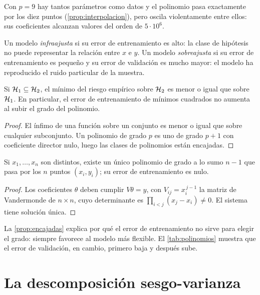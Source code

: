 Con $p=9$ hay tantos parámetros como datos y el polinomio pasa exactamente por los diez puntos (\cref{prop:interpolacion}), pero oscila violentamente entre ellos: sus coeficientes alcanzan valores del orden de $5\cdot 10^{6}$.

\begin{definicion}
Un modelo \emph{infraajusta} si su error de entrenamiento es alto: la clase de hipótesis no puede representar la relación entre $x$ e $y$. Un modelo \emph{sobreajusta} si su error de entrenamiento es pequeño y su error de validación es mucho mayor: el modelo ha reproducido el ruido particular de la muestra.
\end{definicion}

\begin{proposicion}\label{prop:encajadas}
Si $\mathcal{H}_1\subseteq\mathcal{H}_2$, el mínimo del riesgo empírico sobre $\mathcal{H}_2$ es menor o igual que sobre $\mathcal{H}_1$. En particular, el error de entrenamiento de mínimos cuadrados no aumenta al subir el grado del polinomio.
\end{proposicion}

\begin{proof}
El ínfimo de una función sobre un conjunto es menor o igual que sobre cualquier subconjunto. Un polinomio de grado $p$ es uno de grado $p+1$ con coeficiente director nulo, luego las clases de polinomios están encajadas.
\end{proof}

\begin{proposicion}[Interpolación]\label{prop:interpolacion}
Si $x_1,\dots,x_n$ son distintos, existe un único polinomio de grado a lo sumo $n-1$ que pasa por los $n$ puntos $(x_i,y_i)$; su error de entrenamiento es nulo.
\end{proposicion}

\begin{proof}
Los coeficientes $\theta$ deben cumplir $V\theta=y$, con $V_{ij}=x_i^{\,j-1}$ la matriz de Vandermonde de $n\times n$, cuyo determinante es $\prod_{i<j}(x_j-x_i)\ne 0$. El sistema tiene solución única.
\end{proof}

La \cref{prop:encajadas} explica por qué el error de entrenamiento no sirve para elegir el grado: siempre favorece al modelo más flexible. El \cref{tab:polinomios} muestra que el error de validación, en cambio, primero baja y después sube.

\section{La descomposición sesgo-varianza}

